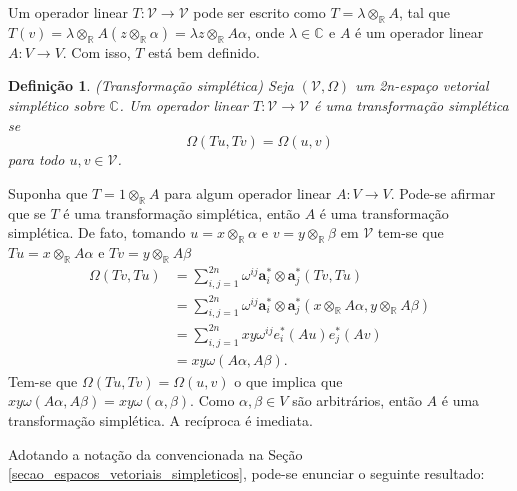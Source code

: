 \documentclass[12pt]{book}
\newtheorem{definicao}[teorema]{Definição}
\newcommand{\complexificado}[1]{\mathcal{#1}}
\newcommand{\complexificacaoelemento}[2]{#1\otimes_{\reta} #2}
\newcommand{\complexo}[1]{\mathbb{C}^{#1}}
\newcommand{\formaSimpletica}[2]{\omega(#1, #2)}
\newcommand{\formaSimpleticaExtendida}[2]{\Omega(#1, #2)}
\newcommand{\real}[1]{\mathbb{R}^{#1}}
\newcommand{\reta}{\real{}}
\begin{document}
	Um operador linear $T : \complexificado{V} \to \complexificado{V}$ pode ser escrito como $T=\complexificacaoelemento{\lambda}{A}$, tal que $T(v) = \complexificacaoelemento{\lambda}{A}(\complexificacaoelemento{z}{\alpha}) = \complexificacaoelemento{\lambda z}{A\alpha}$, onde $\lambda \in \complexo{}$ e $A$ é um operador linear $A:V \to V$. Com isso, $T$ está bem definido.
	
	\begin{definicao}
		(Transformação simplética) Seja $(\complexificado{V}, \Omega)$ um 2n-espaço vetorial simplético sobre $\complexo{}$. Um operador linear $T: \complexificado{V} \to \complexificado{V}$ é uma transformação simplética se 
		$$
		\formaSimpleticaExtendida{Tu}{Tv} = \formaSimpleticaExtendida{u}{v}
		$$ para todo $u,v\in \complexificado{V}$.
	\end{definicao}
	
	Suponha que $T=\complexificacaoelemento{1}{A}$ para algum operador linear $A:V \to V$. Pode-se afirmar que se $T$ é uma transformação simplética, então $A$ é uma transformação simplética. De fato, tomando $u = \complexificacaoelemento{x}{\alpha}$ e $v=\complexificacaoelemento{y}{\beta}$ em $\complexificado{V}$ tem-se que $Tu = \complexificacaoelemento{x}{A\alpha}$ e $Tv= \complexificacaoelemento{y}{A\beta}$
	$$
	\begin{aligned}
	\Omega(Tv,Tu)
	&= \sum_{i,j = 1}^{2n}
	\omega^{ij}\textbf{a}^{*}_{i}\otimes \textbf{a}^{*}_{j}(Tv,Tu)
	\\
	&= 
	\sum_{i,j = 1}^{2n}
	\omega^{ij}\textbf{a}^{*}_{i}\otimes \textbf{a}^{*}_{j}(\complexificacaoelemento{x}{A\alpha},\complexificacaoelemento{y}{A\beta})
	\\
	&= \sum_{i,j = 1}^{2n}
	xy\omega^{ij}e^{*}_{i}(Au)e^{*}_{j}(Av)
	\\
	&= xy
	\formaSimpletica{A\alpha}{A\beta}.
	\end{aligned}
	$$  
	Tem-se que $\formaSimpleticaExtendida{Tu}{Tv} = \formaSimpleticaExtendida{u}{v}$ o que implica que $xy
	\formaSimpletica{A\alpha}{A\beta} = xy
	\formaSimpletica{\alpha}{\beta}$. Como $\alpha, \beta \in V$ são arbitrários, então $A$ é uma transformação simplética. A recíproca é imediata.
	
	Adotando a notação da convencionada na Seção \ref{secao_espacos_vetoriais_simpleticos}, pode-se enunciar o seguinte resultado:
	
\end{document}
